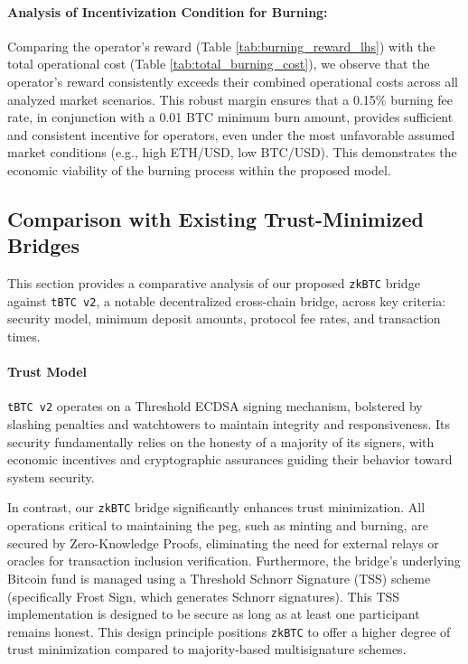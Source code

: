 \documentclass{DESSThesis}
\newcommand{\zktoken}{\texttt{zkBTC}}
\begin{document}
\paragraph{Analysis of Incentivization Condition for Burning:}
Comparing the operator's reward (Table \ref{tab:burning_reward_lhs}) with the total operational cost (Table \ref{tab:total_burning_cost}), we observe that the operator's reward consistently exceeds their combined operational costs across all analyzed market scenarios. This robust margin ensures that a 0.15\% burning fee rate, in conjunction with a 0.01 BTC minimum burn amount, provides sufficient and consistent incentive for operators, even under the most unfavorable assumed market conditions (e.g., high ETH/USD, low BTC/USD). This demonstrates the economic viability of the burning process within the proposed model.

\subsection{Comparison with Existing Trust-Minimized Bridges} \label{subsec:performance_comparison}
This section provides a comparative analysis of our proposed \texttt{\zktoken} bridge against \texttt{tBTC v2}, a notable decentralized cross-chain bridge, across key criteria: security model, minimum deposit amounts, protocol fee rates, and transaction times.

\paragraph{Trust Model}
\texttt{tBTC v2} operates on a Threshold ECDSA signing mechanism, bolstered by slashing penalties and watchtowers to maintain integrity and responsiveness. Its security fundamentally relies on the honesty of a majority of its signers, with economic incentives and cryptographic assurances guiding their behavior toward system security.

In contrast, our \texttt{\zktoken} bridge significantly enhances trust minimization. All operations critical to maintaining the peg, such as minting and burning, are secured by Zero-Knowledge Proofs, eliminating the need for external relays or oracles for transaction inclusion verification. Furthermore, the bridge's underlying Bitcoin fund is managed using a Threshold Schnorr Signature (TSS) scheme (specifically Frost Sign, which generates Schnorr signatures). This TSS implementation is designed to be secure as long as at least one participant remains honest. This design principle positions \texttt{\zktoken} to offer a higher degree of trust minimization compared to majority-based multisignature schemes.
\end{document}
